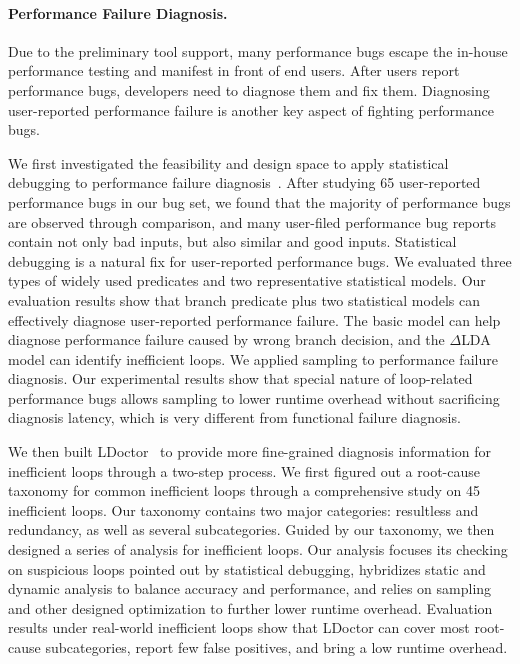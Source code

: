 \documentclass[10pt]{article}
\begin{document}
\vspace{-.1in}
\paragraph{Performance Failure Diagnosis.}
Due to the preliminary tool support, many performance bugs escape the in-house performance testing and manifest in front of end users. 
After users report performance bugs, developers need to diagnose them and fix them.
Diagnosing user-reported performance failure is another key aspect of fighting performance bugs. 

%
We first investigated the feasibility and design space to apply statistical debugging to performance failure diagnosis~\cite{Song14OOPSLA}.
After studying 65 user-reported performance bugs in our bug set, 
we found that the majority of performance bugs are observed through comparison, 
and many user-filed performance bug reports contain not only bad inputs, but also similar and good inputs.
Statistical debugging is a natural fix for user-reported performance bugs. 
We evaluated three types of widely used predicates and two representative statistical models. 
Our evaluation results show that branch predicate plus two statistical models can effectively diagnose user-reported performance failure. 
The basic model can help diagnose performance failure caused by wrong branch decision, and the $\Delta$LDA model can identify inefficient loops.  
We applied sampling to performance failure diagnosis. Our experimental results show that
special nature of loop-related performance bugs allows sampling to lower runtime overhead without sacrificing diagnosis latency, 
which is very different from functional failure diagnosis.

We then built LDoctor~\cite{Song17ICSE} to provide more fine-grained diagnosis information for inefficient loops through a two-step process. 
We first figured out a root-cause taxonomy for common inefficient loops through a comprehensive study on 45 inefficient loops. 
Our taxonomy contains two major categories: resultless and redundancy, as well as several subcategories. 
Guided by our taxonomy, we then designed a series of analysis for inefficient loops. 
Our analysis 
focuses its checking on suspicious loops pointed out by statistical debugging, 
hybridizes static and dynamic analysis to balance accuracy and performance, 
and relies on sampling and other designed optimization to further lower runtime overhead. 
Evaluation results under real-world inefficient loops show that LDoctor can cover most root-cause subcategories, 
report few false positives, and bring a low runtime overhead. 
\end{document}
